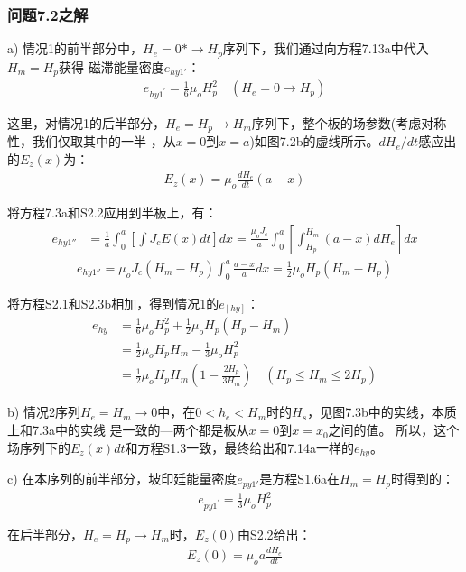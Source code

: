 \subsubsection{问题7.2之解}
a) 情况1的前半部分中，$H_e=0*\rightarrow H_p$序列下，我们通过向方程7.13a中代入$H_m=H_p$获得
磁滞能量密度$e_{hy1'}$：
\begin{align*}%
e_{hy1^\prime}=\frac{1}{6}\mu_oH_{p}^{2}  \quad     (H_e=0\rightarrow H_p) \tag{S2.1}
\end{align*}

这里，对情况1的后半部分，$H_e=H_p\rightarrow H_m$序列下，整个板的场参数(考虑对称性，我们仅取其中的一半
，从$x=0$到$x=a$)如图7.2b的虚线所示。$dH_e/dt$感应出的$E_z(x)$为：
\begin{align*}%
E_z(x)=\mu_o\frac{dH_e}{dt}(a-x) \tag{S2.2}
\end{align*}

将方程7.3a和S2.2应用到半板上，有：
\begin{align*}%
e_{hy1''}&=\frac{1}{a}\int_{0}^{a}\left[\int J_cE(x)dt\right]dx=\frac{\mu_oJ_c}{a}\int_{0}^{a}\left[\int_{H_p}^{H_m}(a-x)dH_e\right]dx \tag{S2.3a}
\end{align*}
\begin{align*}
e_{hy1''}=\mu_oJ_c(H_m-H_p)\int_{0}^{a}\frac{a-x}{a}dx=\frac{1}{2}\mu_oH_p(H_m-H_p)\tag{S2.3b}
\end{align*}

将方程S2.1和S2.3b相加，得到情况1的$e_[hy]$：
\begin{align*}%
e_{hy}&=\frac{1}{6}\mu_oH_{p}^{2}+\frac{1}{2}\mu_oH_p(H_p-H_m) \\
&=\frac{1}{2}\mu_oH_pH_m-\frac{1}{3}\mu_oH_{p}^{2}\\
&=\frac{1}{2}\mu_oH_pH_m\left(1-\frac{2H_p}{3H_m}\right) \quad (H_p\leq H_m\leq 2H_p) \tag{7.13b}
\end{align*}

b) 情况2序列$H_e=H_m\rightarrow 0$中，在$0<h_e<H_m$时的$H_s$，见图7.3b中的实线，本质上和7.3a中的实线
是一致的---两个都是板从$x=0$到$x=x_0$之间的值。
所以，这个场序列下的$E_z(x)dt$和方程S1.3一致，最终给出和7.14a一样的$e_{hy}$。

c) 在本序列的前半部分，坡印廷能量密度$e_{py1'}$是方程S1.6a在$H_m=H_p$时得到的：
\begin{align*}%
e_{py1^\prime}=\frac{1}{3}\mu_oH_{p}^{2} \tag{S2.4a}
\end{align*}

在后半部分，$H_e=H_p\rightarrow H_m$时，$E_z(0)$由S2.2给出：
\begin{align*}%
E_z(0)=\mu_oa\frac{dH_e}{dt}  \tag{S2.5}
\end{align*}

